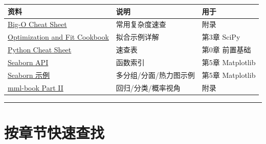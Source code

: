 {\def\LTcaptype{none} %
\begin{longtable}[]{@{}
  >{\raggedright\arraybackslash}p{}
  >{\raggedright\arraybackslash}p{}
  >{\raggedright\arraybackslash}p{}@{}}
\toprule\noalign{}
\begin{minipage}[b]{\linewidth}\raggedright
资料
\end{minipage} & \begin{minipage}[b]{\linewidth}\raggedright
说明
\end{minipage} & \begin{minipage}[b]{\linewidth}\raggedright
用于
\end{minipage} \\
\midrule\noalign{}
\endhead
\bottomrule\noalign{}
\endlastfoot
\href{https://www.bigocheatsheet.com/}{Big-O Cheat Sheet} &
常用复杂度速查 & 附录 \\
\href{https://scipy.github.io/old-wiki/pages/Cookbook/OptimizationAndFitDemo1.html}{Optimization
and Fit Cookbook} & 拟合示例详解 & 第3章 SciPy \\
\href{https://www.pythoncheatsheet.org/}{Python Cheat Sheet} & 速查表 &
第0章 前置基础 \\
\href{https://seaborn.pydata.org/api.html}{Seaborn API} & 函数索引 &
第5章 Matplotlib \\
\href{https://seaborn.pydata.org/examples/index.html}{Seaborn 示例} &
多分组/分面/热力图示例 & 第5章 Matplotlib \\
\href{https://mml-book.github.io/}{mml-book Part II} &
回归/分类/概率视角 & 附录 \\
\end{longtable}
}

\begin{center}\rule{0.5\linewidth}{0.5pt}\end{center}

\section{按章节快速查找}\label{ux6309ux7ae0ux8282ux5febux901fux67e5ux627e}

